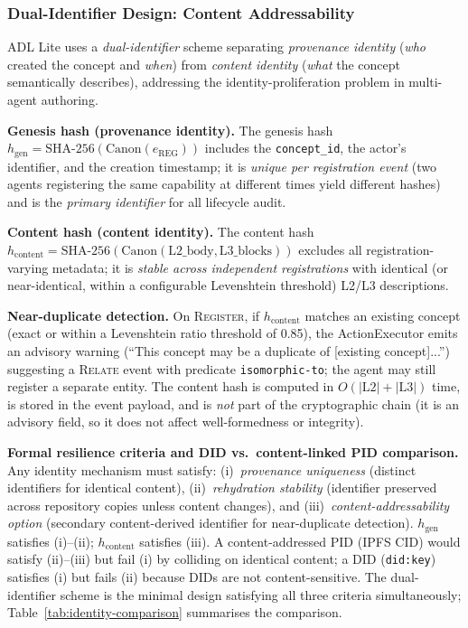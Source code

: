 \subsubsection{Dual-Identifier Design: Content Addressability}
\label{subsubsec:dual-identifier}

ADL Lite uses a \emph{dual-identifier} scheme separating \emph{provenance identity} (\emph{who} created the concept and \emph{when}) from \emph{content identity} (\emph{what} the concept semantically describes), addressing the identity-proliferation problem in multi-agent authoring.

\textbf{Genesis hash (provenance identity).} The genesis hash $h_{\text{gen}} = \text{SHA-256}(\text{Canon}(e_{\text{REG}}))$ includes the \texttt{concept\_id}, the actor's identifier, and the creation timestamp; it is \emph{unique per registration event} (two agents registering the same capability at different times yield different hashes) and is the \emph{primary identifier} for all lifecycle audit.

\textbf{Content hash (content identity).} The content hash $h_{\text{content}} = \text{SHA-256}(\text{Canon}(\text{L2\_body}, \text{L3\_blocks}))$ excludes all registration-varying metadata; it is \emph{stable across independent registrations} with identical (or near-identical, within a configurable Levenshtein threshold) L2/L3 descriptions.

\textbf{Near-duplicate detection.} On \textsc{Register}, if $h_{\text{content}}$ matches an existing concept (exact or within a Levenshtein ratio threshold of 0.85), the ActionExecutor emits an advisory warning (``This concept may be a duplicate of [existing concept]...'') suggesting a \textsc{Relate} event with predicate \texttt{isomorphic-to}; the agent may still register a separate entity. The content hash is computed in $O(|\text{L2}| + |\text{L3}|)$ time, is stored in the event payload, and is \emph{not} part of the cryptographic chain (it is an advisory field, so it does not affect well-formedness or integrity).

\textbf{Formal resilience criteria and DID vs.~content-linked PID comparison.} Any identity mechanism must satisfy: (i)~\emph{provenance uniqueness} (distinct identifiers for identical content), (ii)~\emph{rehydration stability} (identifier preserved across repository copies unless content changes), and (iii)~\emph{content-addressability option} (secondary content-derived identifier for near-duplicate detection). $h_{\text{gen}}$ satisfies (i)--(ii); $h_{\text{content}}$ satisfies (iii). A content-addressed PID (IPFS CID) would satisfy (ii)--(iii) but fail (i) by colliding on identical content; a DID (\texttt{did:key}) satisfies (i) but fails (ii) because DIDs are not content-sensitive. The dual-identifier scheme is the minimal design satisfying all three criteria simultaneously; Table~\ref{tab:identity-comparison} summarises the comparison.

